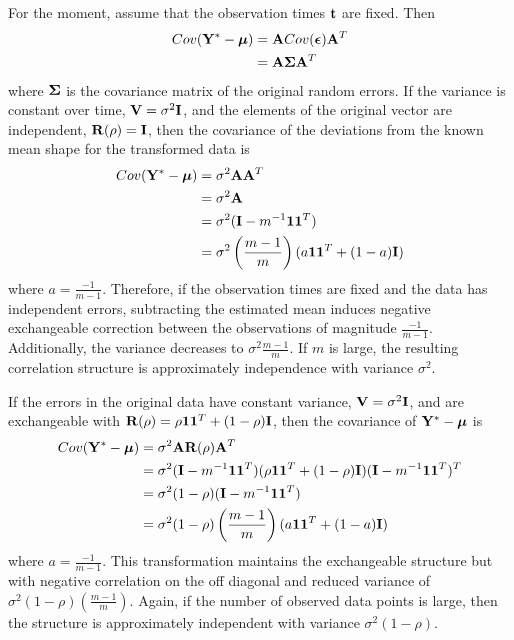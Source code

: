For the moment, assume that the observation times $\mathbf t$ are fixed. Then
\begin{align*}
Cov(\mathbf Y^{*} - \boldsymbol\mu)&= \mathbf ACov(\boldsymbol\epsilon)\mathbf A^{T}\\
&= \mathbf A\boldsymbol\Sigma \mathbf A^{T}
\end{align*}
where $\boldsymbol\Sigma$ is the covariance matrix of the original random errors. If the variance is constant over time, $\mathbf V=\sigma^{2}\mathbf I$, and the elements of the original vector are independent, $\mathbf R(\rho)=\mathbf I$, then the covariance of the deviations from the known mean shape for the transformed data is
\begin{align*} 
Cov(\mathbf Y^{*}- \boldsymbol\mu) &= \sigma^{2}\mathbf A\mathbf A^{T} \\
&=\sigma^{2}\mathbf A\\
&= \sigma^{2}(\mathbf I - m^{-1}\mathbf1\mathbf1^{T})\\
&=\sigma^{2}\left(\frac{m-1}{m}\right)(a\mathbf 1\mathbf 1^{T}+ (1-a)\mathbf I)
\end{align*}
 where $a=\frac{-1}{m-1}$. Therefore, if the observation times are fixed and the data has independent errors, subtracting the estimated mean induces negative exchangeable correction between the observations of magnitude $\frac{-1}{m-1}$. Additionally, the variance decreases to $\sigma^{2}\frac{m-1}{m}$. If $m$ is large, the resulting correlation structure is approximately independence with variance $\sigma^{2}$.
 
 If the errors in the original data have constant variance, $\mathbf V=\sigma^{2}\mathbf I$, and are exchangeable with $\mathbf R(\rho) = \rho\mathbf 1 \mathbf 1^{T} + (1-\rho)\mathbf I$, then the covariance of $\mathbf Y^{*} - \boldsymbol\mu$ is
 \begin{align*}
 Cov(\mathbf Y^{*}- \boldsymbol\mu) &= \sigma^{2}\mathbf A\mathbf R(\rho)\mathbf A^{T}\\
 &= \sigma^{2}(\mathbf I-m^{-1}\mathbf1\mathbf1^{T})(\rho\mathbf1\mathbf1^{T}+(1-\rho)\mathbf I)(\mathbf I-m^{-1}\mathbf1\mathbf1^{T})^{T}\\
 &= \sigma^{2}(1-\rho)(\mathbf I-m^{-1}\mathbf1\mathbf1^{T})\\
 &=\sigma^{2}(1-\rho)\left(\frac{m-1}{m}\right)(a\mathbf 1\mathbf 1^{T}+ (1-a)\mathbf I)
 \end{align*} 
 where $a=\frac{-1}{m-1}$. This transformation maintains the exchangeable structure but with negative correlation on the off diagonal and reduced variance of $\sigma^{2}(1-\rho)\left(\frac{m-1}{m}\right)$.  Again, if the number of observed data points is large, then the structure is approximately independent with variance $\sigma^{2}(1-\rho)$.

